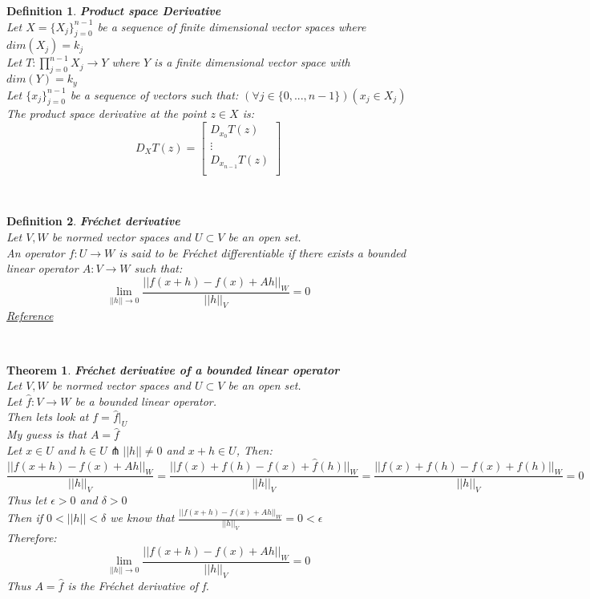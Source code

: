 \documentclass[12pt]{extarticle}
\theoremstyle{plain}
\newtheorem{thm}{Theorem}[section]
\theoremstyle{plain}
\theoremstyle{plain}
\theoremstyle{Definition}
\newtheorem{def.}{Definition}[section]
\theoremstyle{Definition}
\theoremstyle{plain}
\newcommand{\cut}[0]{\noindent\framebox[\linewidth]{\rule{\linewidth}{2pt}}\\}
\begin{document}
\newpage
\begin{def.} \textbf{Product space Derivative} \\ 
		Let $X = \{X_j\}_{j=0}^{n-1}$ be a sequence of finite dimensional vector spaces where $dim(X_j) = k_j$ \\ 
		Let $T : \prod_{j=0}^{n-1} X_j \to Y$ where $Y$ is a finite dimensional vector space with $dim(Y) = k_y$ \\
		Let $\{x_j\}_{j=0}^{n-1}$ be a sequence of vectors such that: $(\forall j \in \{0,...,n-1\})(x_j \in X_j)$ \\ 
		The product space derivative at the point $z \in X$ is: \\ 
		\[
		D_{X} T(z) = 
		\begin{bmatrix}
		D_{x_0} T(z) \\ 
		\vdots \\ 
		D_{x_{n-1}} T(z) \\ 		
		\end{bmatrix}
		\]
\end{def.}
\cut

\newpage
\begin{def.} \textbf{Fréchet derivative} \\ 
		Let $V,W$ be normed vector spaces and $U \subset V$ be an open set. \\ 
		An operator $f : U \to W$ is said to be Fréchet differentiable if there exists a bounded linear operator $A : V \to W$ such that: \\ 
		$$\lim_{||h||\to0} \frac{||f(x+h) - f(x) + Ah||_W}{||h||_V} = 0$$
		\href{https://en.wikipedia.org/wiki/Fr%C3%A9chet_derivative}{Reference}
\end{def.} 
\cut
\begin{thm} \textbf{Fréchet derivative of a bounded linear operator} \\ 
	Let $V,W$ be normed vector spaces and $U \subset V$ be an open set. \\ 
	Let $\hat{f} : V \to W$ be a bounded linear operator. \\
	Then lets look at $f = \hat{f}|_{U}$ \\ 
	My guess is that $A = \hat{f}$ \\ 
	Let $x \in U$ and $h \in U \pitchfork ||h|| \not = 0$ and $x+h \in U$, Then: \\ 
	$$\frac{||f(x+h) - f(x) + Ah||_W}{||h||_V} = \frac{||f(x)+f(h) - f(x) + \hat{f}(h)||_W}{||h||_V} = \frac{||f(x)+f(h) - f(x) + f(h)||_W}{||h||_V}= 0$$
	Thus let $\epsilon > 0$ and $\delta > 0$ \\ 
	Then if $0 < ||h|| < \delta$ we know that  
	$\frac{||f(x+h) - f(x) + Ah||_W}{||h||_V} = 0 < \epsilon$ \\ 
	Therefore: 
	$$\lim_{||h||\to0} \frac{||f(x+h) - f(x) + Ah||_W}{||h||_V} = 0$$
	Thus $A = \hat{f}$ is the Fréchet derivative  of f. 
\end{thm}
\cut
\end{document}
